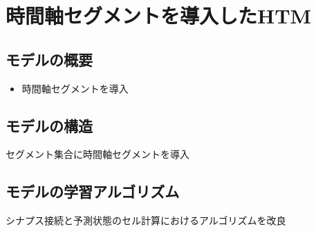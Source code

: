 \chapter{時間軸セグメントを導入したHTM}
\section{モデルの概要}
\begin{itemize}
  \item 時間軸セグメントを導入
\end{itemize}


\section{モデルの構造}
セグメント集合に時間軸セグメントを導入

\section{モデルの学習アルゴリズム}
シナプス接続と予測状態のセル計算におけるアルゴリズムを改良
